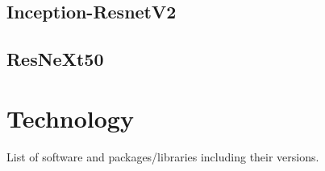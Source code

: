 \documentclass[12pt]{article}
\numberwithin{equation}{section}
\numberwithin{figure}{section}
\begin{document}
\subsection{Inception-ResnetV2} 
\label{sub:Inception-ResnetV2} 
 
\subsection{ResNeXt50} 
\label{sub:ResNeXt50} 
 

\section{Technology} 
\label{sec:Technology} 
List of software and packages/libraries including their versions.
\end{document}
